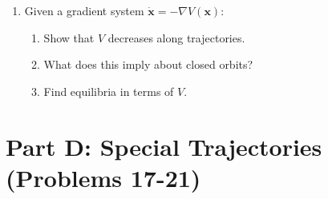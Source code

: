 \documentclass[12pt]{article}
\begin{document}
\begin{enumerate}[resume]
\item Given a gradient system $\dot{\mathbf{x}} = -\nabla V(\mathbf{x})$:
\begin{enumerate}[label=(\alph*)]
    \item Show that $V$ decreases along trajectories.
    \item What does this imply about closed orbits?
    \item Find equilibria in terms of $V$.
\end{enumerate}
\end{enumerate}

\section*{Part D: Special Trajectories (Problems 17-21)}
\end{document}

